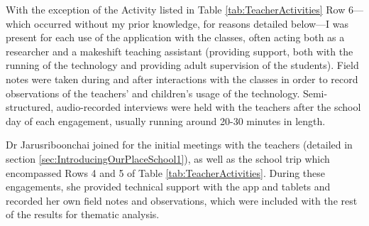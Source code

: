 With the exception of the Activity listed in Table \ref{tab:TeacherActivities} Row 6---which occurred without my prior knowledge, for reasons detailed below---I was present for each use of the application with the classes, often acting both as a researcher and a makeshift teaching assistant (providing support, both with the running of the technology and providing adult supervision of the students). Field notes were taken during and after interactions with the classes in order to record observations of the teachers' and children's usage of the technology. Semi-structured, audio-recorded interviews were held with the teachers after the school day of each engagement, usually running around 20-30 minutes in length.

Dr Jarusriboonchai joined for the initial meetings with the teachers (detailed in section \ref{sec:IntroducingOurPlaceSchool1}), as well as the school trip which encompassed Rows 4 and 5 of Table \ref{tab:TeacherActivities}. During these engagements, she provided technical support with the app and tablets and recorded her own field notes and observations, which were included with the rest of the results for thematic analysis.   

